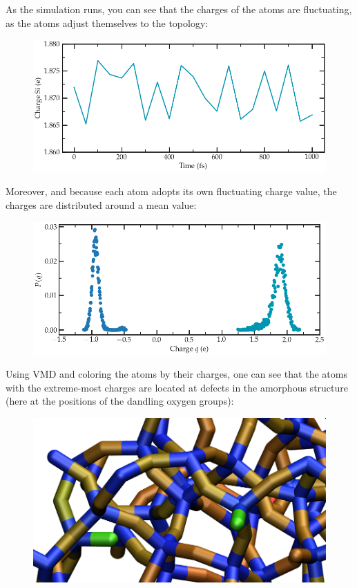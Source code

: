 \noindent As the simulation runs, you can see that the charges of the atoms are fluctuating,
as the atoms adjust themselves to the topology:

\begin{figure}
\includegraphics[width=\linewidth]{tutorials/level3/reactive-silicon-dioxide/average-charge-light.png}
\end{figure}

Moreover, and because each atom adopts its own fluctuating charge value,
the charges are distributed around a mean value:

\begin{figure}
\includegraphics[width=\linewidth]{tutorials/level3/reactive-silicon-dioxide/distribution-charge-light.png}
\end{figure}

Using VMD and coloring the atoms by their charges, one can see that 
the atoms with the extreme-most charges are located at defects in the 
amorphous structure (here at the positions of the dandling oxygen groups):

\begin{figure}
\includegraphics[width=\linewidth]{tutorials/level3/reactive-silicon-dioxide/silicon-light.png}
\end{figure}

